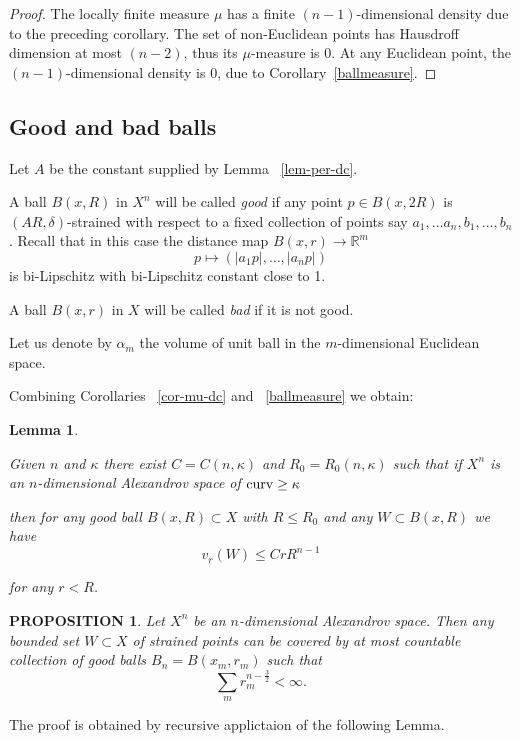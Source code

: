 \documentclass[12pt,leqno,intlimits]{amsart}
\numberwithin{equation}{section}
\newtheorem{lem}[thm]{Lemma}
\newtheorem{prop}[thm]{PROPOSITION}
\theoremstyle{definition}
\theoremstyle{remark}
\def\RR{\mathbb R}
\newcommand{\curv}{\mathop{\rm curv}}
\begin{document}
\begin{proof}
The locally finite measure $\mu$ has a finite $(n-1)$-dimensional density due to the preceding corollary.
The set of non-Euclidean points has Hausdroff dimension at most $(n-2)$, thus its $\mu$-measure is $0$.
At any Euclidean point, the $(n-1)$-dimensional density is $0$, due to Corollary~\ref{ballmeasure}.
\end{proof}


\subsection{Good and bad balls}
Let $A$ be the constant supplied by Lemma ~\ref{lem-per-dc}.

A ball $B(x,R)$ in $X^n$ will be called \emph{good}
if any point $p\in B(x,2 R)$ is  $(AR,\delta)$-strained with respect to a fixed
collection of points say $a_1,\dots a_n,b_1,\dots,b_n$.
Recall that in this case
the distance map $B(x,r)\to \RR^m$
$$p\mapsto(|a_1p|,\dots,|a_np|)$$
is bi-Lipschitz with bi-Lipschitz constant close to 1.

A ball $B(x,r)$ in $X$ will be called \emph{bad} if it is not good.

Let us denote by $\alpha_m$ the volume of unit ball in the $m$-dimensional Euclidean space.

Combining Corollaries ~\ref{cor-mu-dc} and ~\ref{ballmeasure} we obtain:
\begin{lem}\label{lem:good-ball}

Given $n$ and $\kappa$ there exist
 $C=C(n,\kappa)$ and $R_0=R_0(n,\kappa)$ such that if $X^n$ is an $n$-dimensional Alexandrov space of $\curv\ge\kappa$%

 then for any good ball $B(x,R)\subset X$ with $R\le R_0$ and any $W\subset B(x,R)$  we have
 \[
 v_r(W)\le Cr R^{n-1}
 \]


for any $r<R$.
\end{lem}



\begin{prop}\label{prop:covering}
Let $X^n$ be an $n$-dimensional Alexandrov space.
Then any bounded set $W\subset X$ of strained points can be covered by at most countable collection of good balls $B_n=B(x_m,r_m)$
such that
$$\sum_m r_m^{n-\frac32}<\infty.$$

\end{prop}

The proof is obtained by recursive applictaion of the following Lemma.
\end{document}
